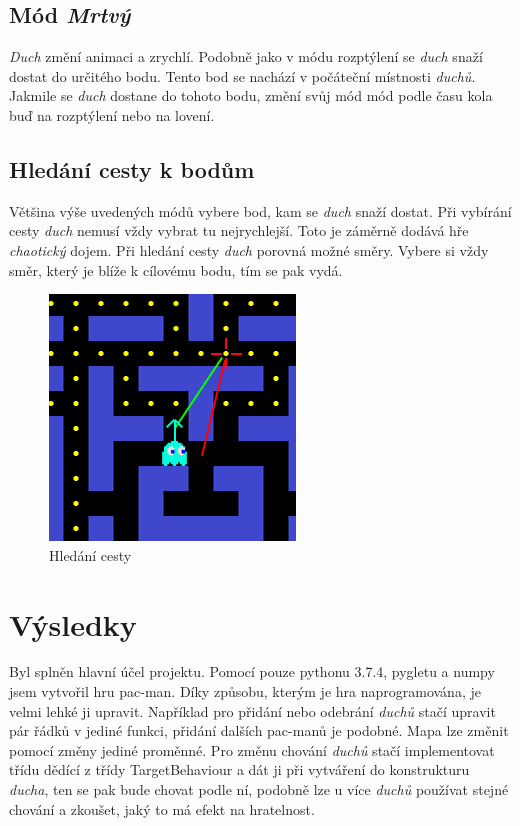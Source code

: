 \documentclass[czech]{pyt-report}
\begin{document}
\subsection{Mód \textit{Mrtvý}}
\textit{Duch} změní animaci a zrychlí. Podobně jako v módu rozptýlení se \textit{duch} snaží dostat do určitého bodu. Tento bod se nachází v počáteční místnosti \textit{duchů}. Jakmile se \textit{duch} dostane do tohoto bodu, změní svůj mód mód podle času kola buď na rozptýlení nebo na lovení.
\subsection{Hledání cesty k bodům}
Většina výše uvedených módů vybere bod, kam se \textit{duch} snaží dostat. Při vybírání cesty \textit{duch} nemusí vždy vybrat tu nejrychlejší. Toto je záměrně dodává hře \textit{chaotický} dojem. Při hledání cesty \textit{duch} porovná možné směry. Vybere si vždy směr, který je blíže k cílovému bodu, tím se pak vydá.
\begin{figure}[h]
  \centering\leavevmode
  \includegraphics[width=.5\linewidth]{img/ai.png}
  \caption{Hledání cesty}
  \label{fig:par-y}
\end{figure}
\onecolumn
\section{Výsledky}

Byl splněn hlavní účel projektu. Pomocí pouze pythonu 3.7.4, pygletu a numpy jsem vytvořil hru pac-man. Díky způsobu, kterým je hra naprogramována, je velmi lehké ji upravit. Například pro přidání nebo odebrání \textit{duchů} stačí upravit pár řádků v jediné funkci, přidání dalších pac-manů je podobné. Mapa lze změnit pomocí změny jediné proměnné. Pro změnu chování \textit{duchů} stačí implementovat třídu dědící z třídy TargetBehaviour a dát ji při vytváření do konstrukturu \textit{ducha}, ten se pak bude chovat podle ní, podobně lze u více \textit{duchů} používat stejné chování a zkoušet, jaký to má efekt na hratelnost.
\end{document}
